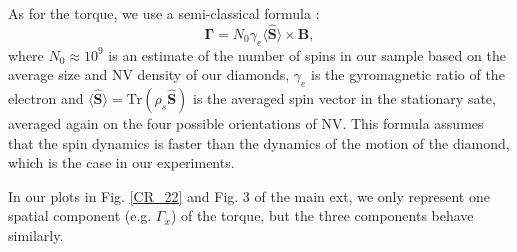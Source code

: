 \documentclass[preprintnumbers,amsmath,amssymb,onecolumn,12pt]{revtex4}
\begin{document}
As for the torque, we use a semi-classical formula :
\begin{equation*}
\mathbf \Gamma = N_0 \gamma_e \langle\hat{\mathbf S}\rangle \times \mathbf B,
\end{equation*}
where $N_0 \approx 10^9$ is an estimate of the number of spins in our sample based on the average size and NV density of our diamonds, $\gamma_e$ is the gyromagnetic ratio of the electron and $\langle\hat{\mathbf S}\rangle =\mathrm{Tr}(\rho_s \mathbf{\hat S})$ is the averaged spin vector in the stationary sate, averaged again on the four possible orientations of NV.
This formula assumes that the spin dynamics is faster than the dynamics of the motion of the diamond, which is the case in our experiments.

In our plots in Fig. \ref{CR_22} and Fig. 3 of the main ext, we only represent one spatial component (e.g. $\Gamma_x$) of the torque, but the three components behave similarly.

\end{document}

